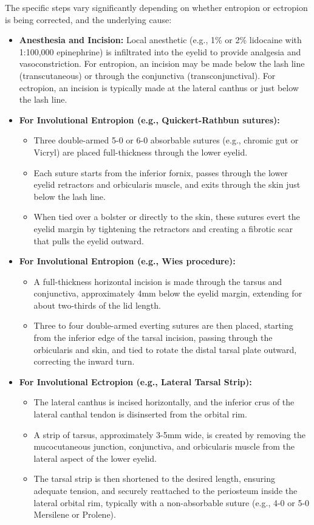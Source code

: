 The specific steps vary significantly depending on whether entropion or ectropion is being corrected, and the underlying cause:

\begin{itemize}
  \item \textbf{Anesthesia and Incision:} Local anesthetic (e.g., 1\% or 2\% lidocaine with 1:100,000 epinephrine) is infiltrated into the eyelid to provide analgesia and vasoconstriction. For entropion, an incision may be made below the lash line (transcutaneous) or through the conjunctiva (transconjunctival). For ectropion, an incision is typically made at the lateral canthus or just below the lash line.

  \item \textbf{For Involutional Entropion (e.g., Quickert-Rathbun sutures):}
    \begin{itemize}
      \item Three double-armed 5-0 or 6-0 absorbable sutures (e.g., chromic gut or Vicryl) are placed full-thickness through the lower eyelid.
      \item Each suture starts from the inferior fornix, passes through the lower eyelid retractors and orbicularis muscle, and exits through the skin just below the lash line.
      \item When tied over a bolster or directly to the skin, these sutures evert the eyelid margin by tightening the retractors and creating a fibrotic scar that pulls the eyelid outward.
    \end{itemize}

  \item \textbf{For Involutional Entropion (e.g., Wies procedure):}
    \begin{itemize}
      \item A full-thickness horizontal incision is made through the tarsus and conjunctiva, approximately 4mm below the eyelid margin, extending for about two-thirds of the lid length.
      \item Three to four double-armed everting sutures are then placed, starting from the inferior edge of the tarsal incision, passing through the orbicularis and skin, and tied to rotate the distal tarsal plate outward, correcting the inward turn.
    \end{itemize}

  \item \textbf{For Involutional Ectropion (e.g., Lateral Tarsal Strip):}
    \begin{itemize}
      \item The lateral canthus is incised horizontally, and the inferior crus of the lateral canthal tendon is disinserted from the orbital rim.
      \item A strip of tarsus, approximately 3-5mm wide, is created by removing the mucocutaneous junction, conjunctiva, and orbicularis muscle from the lateral aspect of the lower eyelid.
      \item The tarsal strip is then shortened to the desired length, ensuring adequate tension, and securely reattached to the periosteum inside the lateral orbital rim, typically with a non-absorbable suture (e.g., 4-0 or 5-0 Mersilene or Prolene).
    \end{itemize}


\end{itemize}
